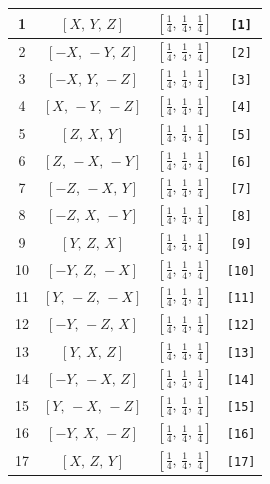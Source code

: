 \documentclass[fleqn,8pt]{jsarticle}
\begin{document}
\begin{longtable}{cccc}
1 & $\left[ X,\, Y,\, Z \right]$ & $\left[ \frac{1}{4},\, \frac{1}{4},\, \frac{1}{4} \right]$ & {\tt [1]} \\ \hline
2 & $\left[ - X,\, - Y,\, Z \right]$ & $\left[ \frac{1}{4},\, \frac{1}{4},\, \frac{1}{4} \right]$ & {\tt [2]} \\ \hline
3 & $\left[ - X,\, Y,\, - Z \right]$ & $\left[ \frac{1}{4},\, \frac{1}{4},\, \frac{1}{4} \right]$ & {\tt [3]} \\ \hline
4 & $\left[ X,\, - Y,\, - Z \right]$ & $\left[ \frac{1}{4},\, \frac{1}{4},\, \frac{1}{4} \right]$ & {\tt [4]} \\ \hline
5 & $\left[ Z,\, X,\, Y \right]$ & $\left[ \frac{1}{4},\, \frac{1}{4},\, \frac{1}{4} \right]$ & {\tt [5]} \\ \hline
6 & $\left[ Z,\, - X,\, - Y \right]$ & $\left[ \frac{1}{4},\, \frac{1}{4},\, \frac{1}{4} \right]$ & {\tt [6]} \\ \hline
7 & $\left[ - Z,\, - X,\, Y \right]$ & $\left[ \frac{1}{4},\, \frac{1}{4},\, \frac{1}{4} \right]$ & {\tt [7]} \\ \hline
8 & $\left[ - Z,\, X,\, - Y \right]$ & $\left[ \frac{1}{4},\, \frac{1}{4},\, \frac{1}{4} \right]$ & {\tt [8]} \\ \hline
9 & $\left[ Y,\, Z,\, X \right]$ & $\left[ \frac{1}{4},\, \frac{1}{4},\, \frac{1}{4} \right]$ & {\tt [9]} \\ \hline
10 & $\left[ - Y,\, Z,\, - X \right]$ & $\left[ \frac{1}{4},\, \frac{1}{4},\, \frac{1}{4} \right]$ & {\tt [10]} \\ \hline
11 & $\left[ Y,\, - Z,\, - X \right]$ & $\left[ \frac{1}{4},\, \frac{1}{4},\, \frac{1}{4} \right]$ & {\tt [11]} \\ \hline
12 & $\left[ - Y,\, - Z,\, X \right]$ & $\left[ \frac{1}{4},\, \frac{1}{4},\, \frac{1}{4} \right]$ & {\tt [12]} \\ \hline
13 & $\left[ Y,\, X,\, Z \right]$ & $\left[ \frac{1}{4},\, \frac{1}{4},\, \frac{1}{4} \right]$ & {\tt [13]} \\ \hline
14 & $\left[ - Y,\, - X,\, Z \right]$ & $\left[ \frac{1}{4},\, \frac{1}{4},\, \frac{1}{4} \right]$ & {\tt [14]} \\ \hline
15 & $\left[ Y,\, - X,\, - Z \right]$ & $\left[ \frac{1}{4},\, \frac{1}{4},\, \frac{1}{4} \right]$ & {\tt [15]} \\ \hline
16 & $\left[ - Y,\, X,\, - Z \right]$ & $\left[ \frac{1}{4},\, \frac{1}{4},\, \frac{1}{4} \right]$ & {\tt [16]} \\ \hline
17 & $\left[ X,\, Z,\, Y \right]$ & $\left[ \frac{1}{4},\, \frac{1}{4},\, \frac{1}{4} \right]$ & {\tt [17]} \\ \hline

\end{longtable}
\end{document}
